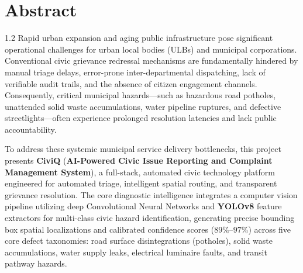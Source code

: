 \chapter*{Abstract}%
%
\vspace{-25pt}

\begin{spacing}{1.2}
\noindent Rapid urban expansion and aging public infrastructure pose significant operational challenges for urban local bodies (ULBs) and municipal corporations. Conventional civic grievance redressal mechanisms are fundamentally hindered by manual triage delays, error-prone inter-departmental dispatching, lack of verifiable audit trails, and the absence of citizen engagement channels. Consequently, critical municipal hazards---such as hazardous road potholes, unattended solid waste accumulations, water pipeline ruptures, and defective streetlights---often experience prolonged resolution latencies and lack public accountability.

\vspace{8pt}

\noindent To address these systemic municipal service delivery bottlenecks, this project presents \textbf{CiviQ} (\textbf{AI-Powered Civic Issue Reporting and Complaint Management System}), a full-stack, automated civic technology platform engineered for automated triage, intelligent spatial routing, and transparent grievance resolution. The core diagnostic intelligence integrates a computer vision pipeline utilizing deep Convolutional Neural Networks and \textbf{YOLOv8} feature extractors for multi-class civic hazard identification, generating precise bounding box spatial localizations and calibrated confidence scores ($89\%$--$97\%$) across five core defect taxonomies: road surface disintegrations (potholes), solid waste accumulations, water supply leaks, electrical luminaire faults, and transit pathway hazards.

\vspace{8pt}


\end{spacing}
